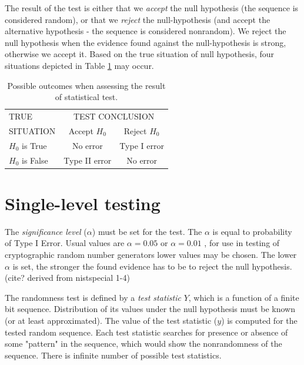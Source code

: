\documentclass[
  digital,     %
  oneside,     %
  nosansbold,  %
  nocolorbold, %
  nolof,         %
  nolot,         %
]{fithesis4}
\begin{document}


The result of the test is either that we \emph{accept} the null hypothesis (the sequence is considered random), or that we \emph{reject} the null-hypothesis (and accept the alternative hypothesis - the sequence is considered nonrandom). We reject the null hypothesis when the evidence found against the null-hypothesis is strong, otherwise we accept it. Based on the true situation of null hypothesis, four situations depicted in Table \ref{tab:type_errors} may occur. \cite[p. 417]{basic_practice}

\begin{table}
  \begin{tabularx}{0.7\textwidth}{l|c|c}
    TRUE  & \multicolumn{2}{c}{TEST CONCLUSION}\\
    SITUATION &Accept $H_0$ & Reject $H_0$\\
    \midrule
    $H_0$ is True &  No error & Type I error  \\
    $H_0$ is False & Type II error & No error \\
  \end{tabularx}
  \caption{Possible outcomes when assessing the result of statistical test.}
  \label{tab:type_errors}
\end{table}

\section{Single-level testing}


The \emph{significance level} ($\alpha$) must be set for the test. The $\alpha$ is equal to probability of Type I Error. Usual values are $\alpha = 0.05$ or $\alpha = 0.01$ \cite[p. 390]{basic_practice}, for use in testing of cryptographic random number generators lower values may be chosen. \cite[p. 1-4]{nist_special} The lower $\alpha$ is set, the stronger the found evidence has to be to reject the null hypothesis. (cite? derived from nistspecial 1-4)


The randomness test is defined by a \emph{test statistic} $Y$, which is a function of a finite bit sequence. Distribution of its values under the null hypothesis must be known (or at least approximated). The value of the test statistic ($y$) is computed for the tested random sequence. Each test statistic searches for presence or absence of some "pattern" in the sequence, which would show the nonrandomness of the sequence. There is infinite number of possible test statistics. \cite[p. 4]{tu01_paper}
\end{document}
